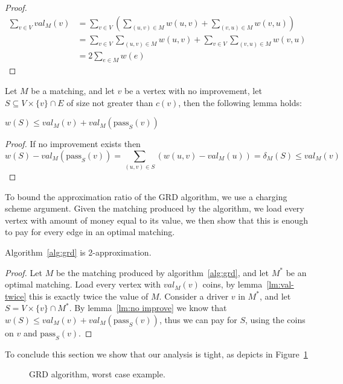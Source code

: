 \begin{proof}
\begin{equation}
\begin{split}
\sum_{v \in V} val_M(v)	& = 
\sum_{v \in V} \left( \sum_{(u, v) \in M} w(u, v) + \sum_{(v, u) \in M} w(v, u) \right)	\\
						& = \sum_{v \in V}\sum_{(u, v) \in M} w(u, v) + 
							\sum_{v \in V}\sum_{(v, u) \in M} w(v, u)					\\
						& = 2 \sum_{e \in M} w(e)
\end{split}
\end{equation}
\end{proof}

Let $M$ be a matching, and let $v$ be a vertex with no improvement,
let $S \subseteq V \times \{v\} \cap E$ of size not greater than $c(v)$,
then the following lemma holds:

\begin{lemma}
\label{lm:no improve}
$w(S) \leq val_M(v) + val_M(\text{pass}_S(v))$
\end{lemma}

\begin{proof}
If no improvement exists then
$$
w(S) - val_M(\text{pass}_S(v))=
\sum_{(u,v) \in S}(w(u,v) - val_M(u)) =
\delta_M(S) 
\leq val_M(v)
$$
\end{proof}

To bound the approximation ratio of the GRD algorithm, 
we use a charging scheme argument.
Given the matching produced by the algorithm, 
we load every vertex with amount of money equal to its value,
we then show that this is enough to pay for every edge in an optimal matching.   

\begin{theorem}
Algorithm~\ref{alg:grd} is 2-approximation.
\end{theorem}

\begin{proof}
Let $M$ be the matching produced by algorithm~\ref{alg:grd}, 
and let $M^*$ be an optimal matching.
Load every vertex with $val_M(v)$ coins, 
by lemma~\ref{lm:val-twice} this is exactly twice the value of $M$.
Consider a driver $v$ in $M^*$, and let $S = V \times \{v\} \cap M^*$.
By lemma~\ref{lm:no improve} we know that $w(S) \leq val_M(v) + val_M(\text{pass}_S(v))$,
thus we can pay for $S$, using the coins on $v$ and $\text{pass}_S(v)$.
\end{proof}

To conclude this section we show that our analysis is tight, 
as depicts in Figure~\ref{fig:grd worst}
\begin{figure}
\caption{
\label{fig:grd worst}
GRD algorithm, worst case example.
}
\centering

\end{figure}